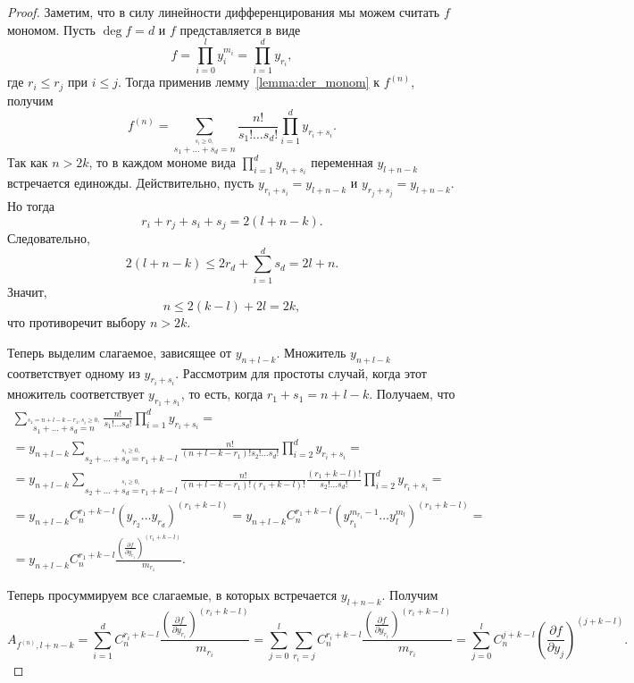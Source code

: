 \documentclass[16pt]{article}
\theoremstyle{plain1}
\theoremstyle{plain2}
\theoremstyle{plain}
\theoremstyle{plain3}
\theoremstyle{definition}
\theoremstyle{remark}
\begin{document}
\begin{proof}
Заметим, что в силу линейности дифференцирования мы можем считать
$f$ мономом. Пусть $\deg f = d$ и $f$ представляется в
виде
$$
f=\prod\limits_{i=0}^ly_i^{m_i}=\prod\limits_{i=1}^{d}y_{r_i},
$$
где $r_i\leqslant r_j$ при $i \leqslant j$. Тогда применив лемму~\ref{lemma:der_monom} к $f^{(n)}$,
получим
$$
f^{(n)}=\sum\limits_{\stackrel{s_i\geqslant0,}{
s_1+\ldots+s_d=n}}\frac{n!}{s_1!\ldots s_d!}
\prod\limits_{i=1}^dy_{r_i+s_i}.
$$
Так как $n>2k$, то в каждом мономе вида $\prod_{i=1}^d y_{r_i+s_i}$
переменная $y_{l+n-k}$ встречается единожды. Действительно, пусть
$y_{r_i+s_i}=y_{l+n-k}$ и $y_{r_j+s_j}=y_{l+n-k}$. Но тогда
$$
r_i+r_j +s_i+s_j = 2(l+n-k).
$$
Следовательно,
$$
2(l+n-k)\leqslant 2r_d + \sum_{i=1}^d s_d = 2l +n.
$$
Значит,
$$
n \leqslant 2(k-l) + 2l =2k,
$$
что противоречит выбору $n>2k$.


Теперь выделим слагаемое, зависящее от $y_{n+l-k}$. Множитель
$y_{n+l-k}$ соответствует одному из $y_{r_i+s_i}$. Рассмотрим для
простоты случай, когда этот множитель соответствует $y_{r_1+s_1}$,
то есть, когда $r_1+s_1 = n+l-k$. Получаем, что
\begin{gather*}
\sum\limits_{\stackrel{s_1 =n+l-k-r_1,
s_i\geqslant0,}{s_1+\ldots+s_d=n}}\frac{n!}{s_1!\ldots s_d!}\prod\limits_{i=1}^dy_{r_i+s_i}=\\
=y_{n+l-k}\sum\limits_{\stackrel{
s_i\geqslant0,}{s_2+\ldots+s_d=r_1+k-l}}\frac{n!}{(n+l-k-r_1)!s_2!\ldots s_d!}\prod\limits_{i=2}^dy_{r_i+s_i}=\\
=y_{n+l-k}\sum\limits_{\stackrel{
s_i\geqslant0,}{s_2+\ldots+s_d=r_1+k-l}}\frac{n!}{(n+l-k-r_1)!(r_1+k-l)!}\frac{(r_1+k-l)!}{s_2!\ldots s_d!}\prod\limits_{i=2}^dy_{r_i+s_i}=\\
=y_{n+l-k}C_n^{r_1+k-l} (y_{r_2}\ldots y_{r_d})^{(r_1+k-l)} =
y_{n+l-k}C_n^{r_1+k-l}(y_{r_1}^{m_{r_1}-1}\ldots
y_{l}^{m_l})^{(r_1+k-l)}=\\
=y_{n+l-k}C_n^{r_1+k-l}\frac{\left(\frac{\partial f}{\partial
y_{r_1}}\right)^{(r_1+k -l)}}{m_{r_1}}.
\end{gather*}

Теперь просуммируем все слагаемые, в которых встречается
$y_{l+n-k}$. Получим
$$
A_{f^{(n)},l+n-k} = \sum_{i=1}^{d}
C_n^{r_i+k-l}\frac{\left(\frac{\partial f}{\partial
y_{r_i}}\right)^{(r_i+k -l)}}{m_{r_i}}= \sum_{j=0}^l \sum_{r_i = j}
C_n^{r_i+k-l}\frac{\left(\frac{\partial f}{\partial
y_{r_i}}\right)^{(r_i+k -l)}}{m_{r_i}} = \sum_{j=0}^l C_n^{j+k-l}
\left(\frac{\partial f}{\partial y_{j}}\right)^{(j+k-l)}.
$$
\end{proof}
\end{document}
